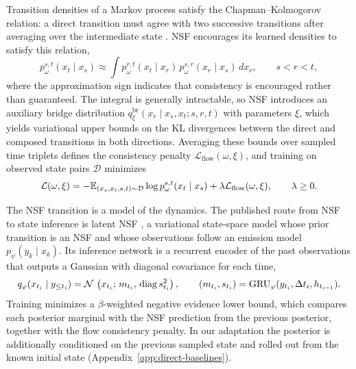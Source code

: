 Transition densities of a Markov process satisfy the Chapman--Kolmogorov relation: a direct transition must agree with two successive transitions after averaging over the intermediate state \citep[Chapter~4, Section~1]{ethier1986markov}. NSF encourages its learned densities to satisfy this relation,
\begin{equation}\label{eq:nsf-chapman-kolmogorov}
 p_\omega^{s,t}(x_t\mid x_s)
 \approx\int p_\omega^{r,t}(x_t\mid x_r)\,
               p_\omega^{s,r}(x_r\mid x_s)\,dx_r,
 \qquad s<r<t,
\end{equation}
where the approximation sign indicates that consistency is encouraged rather than guaranteed. The integral is generally intractable, so NSF introduces an auxiliary bridge distribution $q_\xi^{\mathrm{br}}(x_r\mid x_s,x_t;s,r,t)$ with parameters $\xi$, which yields variational upper bounds on the KL divergences between the direct and composed transitions in both directions. Averaging these bounds over sampled time triplets defines the consistency penalty $\mathcal L_{\mathrm{flow}}(\omega,\xi)$, and training on observed state pairs $\mathcal D$ minimizes
\begin{equation}\label{eq:nsf-training-objective}
 \mathcal L(\omega,\xi)
 =-\mathbb E_{(x_s,x_t,s,t)\sim\mathcal D}
       \log p_\omega^{s,t}(x_t\mid x_s)
   +\lambda\mathcal L_{\mathrm{flow}}(\omega,\xi),
 \qquad \lambda\geq0.
\end{equation}

The NSF transition is a model of the dynamics. The published route from NSF to state inference is latent NSF \citep[Section~4]{kiyohara2025nsf}, a variational state-space model whose prior transition is an NSF and whose observations follow an emission model $p_\psi(y_k\mid x_k)$. Its inference network is a recurrent encoder of the past observations that outputs a Gaussian with diagonal covariance for each time,
\begin{equation}\label{eq:latent-nsf-posterior}
 q_\varphi(x_{t_i}\mid y_{\le t_i})=\mathcal N\,\left(x_{t_i};\,m_{t_i},\,\mathrm{diag}\,s_{t_i}^2\right),
 \qquad (m_{t_i},s_{t_i})=\mathrm{GRU}_\varphi(y_{t_i},\Delta t_i,h_{t_{i-1}}).
\end{equation}
Training minimizes a $\beta$-weighted negative evidence lower bound, which compares each posterior marginal with the NSF prediction from the previous posterior, together with the flow consistency penalty. In our adaptation the posterior is additionally conditioned on the previous sampled state and rolled out from the known initial state (Appendix~\ref{app:direct-baselines}).

